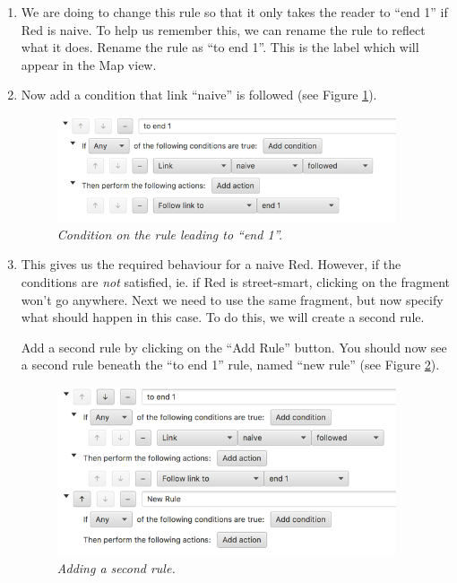 \documentclass{article}
\begin{document}
\begin{enumerate}
\item We are doing to change this rule so that it only takes the reader to ``end 1'' if Red is naive. To help us remember this, we can rename the rule to reflect what it does. Rename the rule as ``to end 1''. This is the label which will appear in the Map view.

\item Now add a condition that link ``naive'' is followed (see Figure
\ref{fig:tut2:to_end_1}).

\begin{figure}[h]
  \centering
  \includegraphics[width=10cm]{images/hypedyn-tutorial-2-figure-3}
  \caption{\textit{Condition on the rule leading to ``end 1''.}}
  \label{fig:tut2:to_end_1}
\end{figure}

\item This gives us the required behaviour for a naive Red. However, if the conditions are \textit{not} satisfied, ie. if Red is street-smart, clicking on the fragment won't go anywhere. Next we need to use the same fragment, but now specify what should happen in this case. To do this, we will create a second rule.

Add a second rule by clicking on the ``Add Rule'' button. You should now
see a second rule beneath the ``to end 1'' rule, named ``new rule''  (see Figure \ref{fig:tut2:new_rule}).

\begin{figure}[h]
  \centering
  \includegraphics[width=10cm]{images/hypedyn-tutorial-2-figure-4}
  \caption{\textit{Adding a second rule.}}
  \label{fig:tut2:new_rule}
\end{figure}


\end{enumerate}
\end{document}
